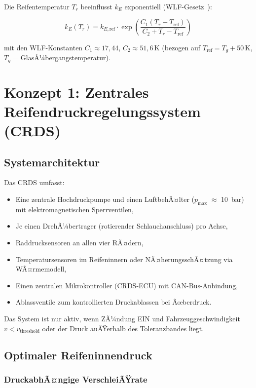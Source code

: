 ﻿\documentclass[12pt,a4paper]{article}
\theoremstyle{definition}
\theoremstyle{remark}
\begin{document}
Die Reifentemperatur $T_r$ beeinflusst $k_E$ exponentiell (WLF-Gesetz~\cite{Williams1955}):

\begin{equation}
  k_E(T_r) = k_{E,\mathrm{ref}}\cdot\exp\!\left(\frac{C_1(T_r - T_{\mathrm{ref}})}
    {C_2 + T_r - T_{\mathrm{ref}}}\right)
  \label{eq:wlf}
\end{equation}

mit den WLF-Konstanten $C_1 \approx 17{,}44$, $C_2 \approx 51{,}6$\,K
(bezogen auf $T_{\mathrm{ref}} = T_g + 50$\,K, $T_g$ = GlasÃ¼bergangstemperatur).

\section{Konzept 1: Zentrales Reifendruckregelungssystem (CRDS)}
\label{sec:crds}

\subsection{Systemarchitektur}

Das CRDS umfasst:
\begin{itemize}
  \item Eine zentrale Hochdruckpumpe und einen LuftbehÃ¤lter ($p_{\max}$
        $\approx$ \SI{10}{\bar}) mit elektromagnetischen Sperrventilen,
  \item Je einen DrehÃ¼bertrager (rotierender Schlauchanschluss) pro Achse,
  \item Raddrucksensoren an allen vier RÃ¤dern,
  \item Temperatursensoren im Reifeninnern oder NÃ¤herungsschÃ¤tzung via
        WÃ¤rmemodell,
  \item Einen zentralen Mikrokontroller (CRDS-ECU) mit CAN-Bus-Anbindung,
  \item Ablassventile zum kontrollierten Druckablassen bei Ãœberdruck.
\end{itemize}

Das System ist nur aktiv, wenn ZÃ¼ndung EIN und Fahrzeuggeschwindigkeit
$v < v_{\mathrm{threshold}}$ oder der Druck auÃŸerhalb des Toleranzbandes liegt.

\subsection{Optimaler Reifeninnendruck}

\subsubsection{DruckabhÃ¤ngige VerschleiÃŸrate}
\end{document}
